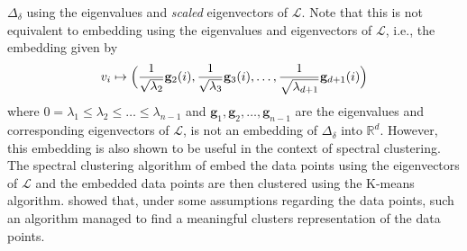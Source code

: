 $\Delta_\delta$ using the eigenvalues and \emph{scaled} eigenvectors
of $\bm{\mathcal{L}}$. Note that this is not equivalent to embedding
using the eigenvalues and eigenvectors of $\bm{\mathcal{L}}$, i.e.,
the embedding given by
\begin{equation}
  \label{eq:102}
  v_i \mapsto \Bigl( \frac{1}{\sqrt{\lambda_2}} \mathbf{g}_2(i),
  \frac{1}{\sqrt{\lambda_3}}\mathbf{g}_3(i), \dots, \frac{1}{\sqrt{
      \lambda_{d+1}}} \mathbf{g}_{d+1}(i) \Bigr)
\end{equation}
where $0 = \lambda_1 \leq \lambda_2 \leq \dots \leq \lambda_{n-1}$ and
$\bm{g}_1, \bm{g}_2, \dots, \bm{g}_{n-1}$ are the eigenvalues and
corresponding eigenvectors of $\bm{\mathcal{L}}$, is not an embedding
of $\Delta_{\delta}$ into $\mathbb{R}^{d}$. However, this embedding is
also shown to be useful in the context of spectral clustering. The
spectral clustering algorithm of \citet{ng02} embed the data points
using the eigenvectors of $\bm{\mathcal{L}}$ and the embedded data
points are then clustered using the K-means algorithm. \citet{ng02}
showed that, under some assumptions regarding the data points, such an
algorithm managed to find a meaningful clusters representation of the
data points.
%
